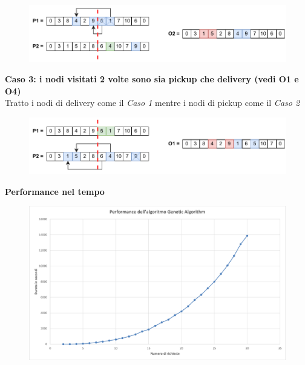\documentclass[9pt]{beamer}
\begin{document}
\begin{frame}[allowframebreaks]{\subsecname}
      	\begin{figure}[h]
	\centering
	\includegraphics[width=\textwidth]
	{../images/crossover-1d}
	\end{figure}

\framebreak

	\textbf{Caso 3: i nodi visitati 2 volte sono sia pickup che delivery (vedi O1 e O4)} \\
	Tratto i nodi di delivery come il \emph{Caso 1} mentre i nodi di pickup come il \emph{Caso 2}

      	\begin{figure}[h]
	\centering
	\includegraphics[width=\textwidth]
	{../images/crossover-1e}
	\end{figure}

\framebreak

	\textbf{Performance nel tempo}
      	\begin{figure}[h]
	\centering
	\includegraphics[width=\textwidth]
	{../charts/19 Performance dell'algoritmo Genetic Algorithm}
	\end{figure}

\end{frame}
\end{document}

